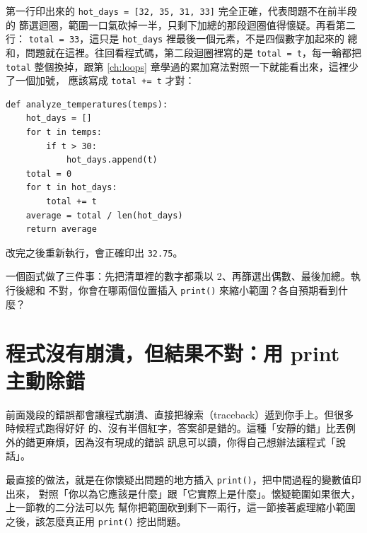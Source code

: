 
第一行印出來的 \texttt{hot\_days = [32, 35, 31, 33]} 完全正確，代表問題不在前半段的
篩選迴圈，範圍一口氣砍掉一半，只剩下加總的那段迴圈值得懷疑。再看第二行：
\texttt{total = 33}，這只是 \texttt{hot\_days} 裡最後一個元素，不是四個數字加起來的
總和，問題就在這裡。往回看程式碼，第二段迴圈裡寫的是 \texttt{total = t}，每一輪都把
\texttt{total} 整個換掉，跟第 \ref{ch:loops} 章學過的累加寫法對照一下就能看出來，這裡少了一個加號，
應該寫成 \texttt{total += t} 才對：

\begin{verbatim}
def analyze_temperatures(temps):
    hot_days = []
    for t in temps:
        if t > 30:
            hot_days.append(t)
    total = 0
    for t in hot_days:
        total += t
    average = total / len(hot_days)
    return average
\end{verbatim}

改完之後重新執行，會正確印出 \texttt{32.75}。


\begin{drills}[label=drills:bisect-debug]
\item 一個函式做了三件事：先把清單裡的數字都乘以 2、再篩選出偶數、最後加總。執行後總和
不對，你會在哪兩個位置插入 \texttt{print()} 來縮小範圍？各自預期看到什麼？
\end{drills}

\section{程式沒有崩潰，但結果不對：用 print 主動除錯}
\label{sec:print-debug}

前面幾段的錯誤都會讓程式崩潰、直接把線索（traceback）遞到你手上。但很多時候程式跑得好好
的、沒有半個紅字，答案卻是錯的。這種「安靜的錯」比丟例外的錯更麻煩，因為沒有現成的錯誤
訊息可以讀，你得自己想辦法讓程式「說話」。

最直接的做法，就是在你懷疑出問題的地方插入 \texttt{print()}，把中間過程的變數值印出來，
對照「你以為它應該是什麼」跟「它實際上是什麼」。懷疑範圍如果很大，上一節教的二分法可以先
幫你把範圍砍到剩下一兩行，這一節接著處理縮小範圍之後，該怎麼真正用 \texttt{print()}
挖出問題。

